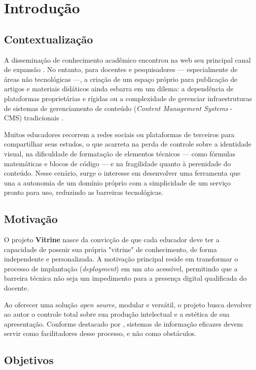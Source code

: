 \chapter{Introdução}\label{cap:intro}

\section{Contextualização}
A disseminação de conhecimento acadêmico encontrou na web seu principal canal de expansão \cite{ref7}. No entanto, para docentes e pesquisadores — especialmente de áreas não tecnológicas —, a criação de um espaço próprio para publicação de artigos e materiais didáticos ainda esbarra em um dilema: a dependência de plataformas proprietárias e rígidas ou a complexidade de gerenciar infraestruturas de sistemas de gerenciamento de conteúdo (\textit{Content Management Systems} - CMS) tradicionais \cite{ref6}.

Muitos educadores recorrem a redes sociais ou plataformas de terceiros para compartilhar seus estudos, o que acarreta na perda de controle sobre a identidade visual, na dificuldade de formatação de elementos técnicos — como fórmulas matemáticas e blocos de código — e na fragilidade quanto à perenidade do conteúdo. Nesse cenário, surge o interesse em desenvolver uma ferramenta que una a autonomia de um domínio próprio com a simplicidade de um serviço pronto para uso, reduzindo as barreiras tecnológicas.

\section{Motivação}
O projeto \textbf{Vitrine} nasce da convicção de que cada educador deve ter a capacidade de possuir sua própria "vitrine" de conhecimento, de forma independente e personalizada. A motivação principal reside em transformar o processo de implantação (\textit{deployment}) em um ato acessível, permitindo que a barreira técnica não seja um impedimento para a presença digital qualificada do docente. 

Ao oferecer uma solução \textit{open source}, modular e versátil, o projeto busca devolver ao autor o controle total sobre sua produção intelectual e a estética de sua apresentação. Conforme destacado por , sistemas de informação eficazes devem servir como facilitadores desse processo, e não como obstáculos.

\section{Objetivos}

